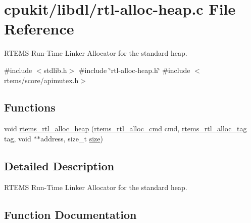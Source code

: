 \hypertarget{rtl-alloc-heap_8c}{}\section{cpukit/libdl/rtl-\/alloc-\/heap.c File Reference}
\label{rtl-alloc-heap_8c}


R\+T\+E\+MS Run-\/\+Time Linker Allocator for the standard heap.  


{\ttfamily \#include $<$stdlib.\+h$>$}\newline
{\ttfamily \#include \char`\"{}rtl-\/alloc-\/heap.\+h\char`\"{}}\newline
{\ttfamily \#include $<$rtems/score/apimutex.\+h$>$}\newline
\subsection*{Functions}
\begin{DoxyCompactItemize}
\item 
void \mbox{\hyperlink{rtl-alloc-heap_8c_a5725b252e21bd77ce9fe5a026c1b886f}{rtems\+\_\+rtl\+\_\+alloc\+\_\+heap}} (\mbox{\hyperlink{rtl-allocator_8h_aab433aa2d9689f924523cc8196318daf}{rtems\+\_\+rtl\+\_\+alloc\+\_\+cmd}} cmd, \mbox{\hyperlink{rtl-allocator_8h_a445a8615118b7fc14005ab20583153fd}{rtems\+\_\+rtl\+\_\+alloc\+\_\+tag}} tag, void $\ast$$\ast$address, size\+\_\+t \mbox{\hyperlink{sun4u_2tte_8h_a245260f6f74972558f61b85227df5aae}{size}})
\end{DoxyCompactItemize}


\subsection{Detailed Description}
R\+T\+E\+MS Run-\/\+Time Linker Allocator for the standard heap. 



\subsection{Function Documentation}
\mbox{\label{rtl-alloc-heap_8c_a5725b252e21bd77ce9fe5a026c1b886f}} 
